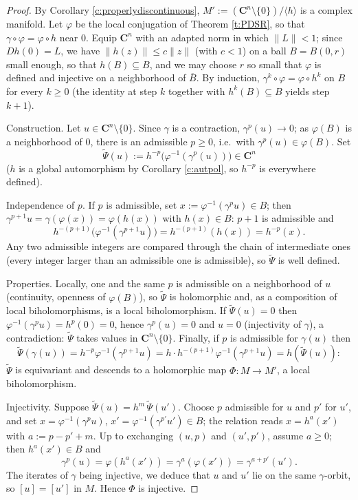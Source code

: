 \documentclass[english,11pt]{amsart}
\theoremstyle{definition}
\theoremstyle{remark}
\numberwithin{equation}{section}
\newcommand{\C}{\mathbf{C}}
\begin{document}
\begin{proof}
By Corollary \ref{c:properlydiscontinuous}, $M':=(\C^n\setminus\{0\})/\langle h\rangle$ is a complex manifold. Let $\varphi$ be the local conjugation of Theorem \ref{t:PDSR}, so that $\gamma\circ\varphi=\varphi\circ h$ near $0$. Equip $\C^n$ with an adapted norm in which $\|L\|<1$; since $Dh(0)=L$, we have $\|h(z)\|\le c\|z\|$ (with $c<1$) on a ball $B=B(0,r)$ small enough, so that $h(B)\subseteq B$, and we may choose $r$ so small that $\varphi$ is defined and injective on a neighborhood of $\overline B$. By induction, $\gamma^{k}\circ\varphi=\varphi\circ h^{k}$ on $B$ for every $k\ge0$ (the identity at step $k$ together with $h^{k}(B)\subseteq B$ yields step $k+1$).

Construction. Let $u\in \C^n\setminus\{0\}$. Since $\gamma$ is a contraction, $\gamma^{p}(u)\to0$; as $\varphi(B)$ is a neighborhood of $0$, there is an admissible $p\ge0$, i.e.\ with $\gamma^{p}(u)\in\varphi(B)$. Set
\[
\widetilde\Psi(u):=h^{-p}\big(\varphi^{-1}(\gamma^{p}(u))\big)\in\C^n
\]
($h$ is a global automorphism by Corollary \ref{c:autpol}, so $h^{-p}$ is everywhere defined).

Independence of $p$. If $p$ is admissible, set $x:=\varphi^{-1}(\gamma^{p}u)\in B$; then $\gamma^{p+1}u=\gamma(\varphi(x))=\varphi(h(x))$ with $h(x)\in B$: $p+1$ is admissible and
\[
h^{-(p+1)}\big(\varphi^{-1}(\gamma^{p+1}u)\big)=h^{-(p+1)}(h(x))=h^{-p}(x).
\]
Any two admissible integers are compared through the chain of intermediate ones (every integer larger than an admissible one is admissible), so $\widetilde\Psi$ is well defined.

Properties. Locally, one and the same $p$ is admissible on a neighborhood of $u$ (continuity, openness of $\varphi(B)$), so $\widetilde\Psi$ is holomorphic and, as a composition of local biholomorphisms, is a local biholomorphism. If $\widetilde\Psi(u)=0$ then $\varphi^{-1}(\gamma^{p}u)=h^{p}(0)=0$, hence $\gamma^{p}(u)=0$ and $u=0$ (injectivity of $\gamma$), a contradiction: $\widetilde\Psi$ takes values in $\C^n\setminus\{0\}$. Finally, if $p$ is admissible for $\gamma(u)$ then
\[
\widetilde\Psi(\gamma(u))=h^{-p}\varphi^{-1}(\gamma^{p+1}u)=h\cdot h^{-(p+1)}\varphi^{-1}(\gamma^{p+1}u)=h(\widetilde\Psi(u)) :
\]
$\widetilde\Psi$ is equivariant and descends to a holomorphic map $\Phi:M\to M'$, a local biholomorphism.

Injectivity. Suppose $\widetilde\Psi(u)=h^{m}\,\widetilde\Psi(u')$. Choose $p$ admissible for $u$ and $p'$ for $u'$, and set $x=\varphi^{-1}(\gamma^{p}u)$, $x'=\varphi^{-1}(\gamma^{p'}u')\in B$; the relation reads $x=h^{a}(x')$ with $a:=p-p'+m$. Up to exchanging $(u,p)$ and $(u',p')$, assume $a\ge0$; then $h^{a}(x')\in B$ and
\[
\gamma^{p}(u)=\varphi(h^{a}(x'))=\gamma^{a}(\varphi(x'))=\gamma^{a+p'}(u').
\]
The iterates of $\gamma$ being injective, we deduce that $u$ and $u'$ lie on the same $\gamma$-orbit, so $[u]=[u']$ in $M$. Hence $\Phi$ is injective.


\end{proof}
\end{document}

